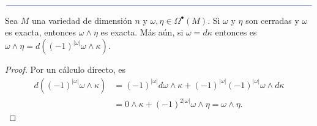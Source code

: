 \documentclass[11pt]{article}
\newcommand{\paint}[1]{\color{color}{#1}}
\newcommand{\paintline}{\begin{center}
$\paint{
\rule{400pt}{0.5pt}
}$
\vspace{10pt}
\end{center}}
\newenvironment{lemma}[2][Lema]{\begin{trivlist}
\item[\hskip \labelsep \paint{{\bfseries #1}}\hskip \labelsep {\bfseries #2.}]}{\end{trivlist}}
\begin{document}
\paintline

\begin{lemma}{6} Sea $M$ una variedad de dimensión $n$ y $\omega, \eta \in \Omega^\bullet(M)$. Si $\omega$ y $\eta$ son cerradas y $\omega$ es exacta, entonces $\omega \wedge \eta$ es exacta. Más aún, si $\omega = d\kappa$ entonces es $\omega \wedge \eta = d((-1)^{|\omega|}\omega \wedge \kappa)$.
\end{lemma}
\begin{proof} Por un cálculo directo, es
\begin{align*}
d((-1)^{|\omega|}\omega \wedge \kappa) &= (-1)^{|\omega|}d\omega \wedge \kappa + (-1)^{|\omega|}(-1)^{|\omega|}\omega \wedge d\kappa\\
&= 0 \wedge \kappa + (-1)^{2|\omega|}\omega \wedge \eta = \omega \wedge \eta.
\end{align*}
\end{proof}
\end{document}
